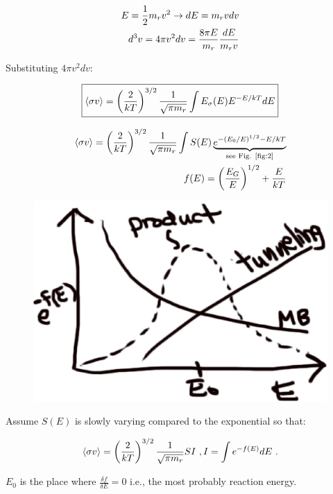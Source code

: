 \begin{align}
E=\frac{1}{2} m_{r}v^{2}\rightarrow dE=m_{r}vdv\\
d^{3}v = 4 \pi v^{2}dv = \frac{8 \pi E}{m_{r}}\frac{dE}{m_{r}v}
\end{align}

Substituting $4 \pi v^{2}dv$:

\begin{align}
\boxed{\langle \sigma v\rangle  = \left( \frac{2}{kT} \right)^{{3/2}} \frac{1}{\sqrt{\pi m_{r}}} \int  E_{\sigma}(E)E^{-E/kT}dE}
\end{align}

\begin{align}
\langle \sigma v\rangle = \left( \frac{2}{kT} \right)^{{3/2}} \frac{1}{\sqrt{\pi m_{r}}} \int S(E) \underbrace{e^{-(E_{0}/E)^{1/2} -E/kT}}_{\textrm{see Fig. \ref{fig:2}}}\\
f(E) =\left(  \frac{E_{G}}{E} \right)^{{1/2}} + \frac{E}{kT}
\end{align}

\begin{figure}[!h]
\centering
\includegraphics[width=\textwidth/2]{images/fig2.eps}
\label{fig:2}
\caption{}
\end{figure}

Assume $S(E)$ is slowly varying compared to the exponential so that:

\begin{align}
\langle \sigma v\rangle = \left( \frac{2}{kT} \right)^{3/2} \frac{1}{\sqrt{\pi m_{r}}} SI~,I = \int e^{-f(E)}dE~.
\end{align}

$E_{0}$ is the place where $\frac{\delta f}{\delta E} = 0$ i.e., the most probably reaction energy. 


